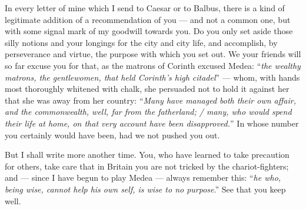 

 In every letter of mine which I send to Caesar or to Balbus, there is a kind of legitimate addition of a recommendation of you --- and not a common one, but with some signal mark of my goodwill towards you. Do you only set aside those silly notions and your longings for the city and city life, and accomplish, by perseverance and virtue, the purpose with which you set out. We your friends will so far excuse you for that, as the matrons of Corinth excused Medea: ``\textit{the wealthy matrons, the gentlewomen, that held Corinth's high citadel}'' --- whom, with hands most thoroughly whitened with chalk, she persuaded not to hold it against her that she was away from her country: ``\textit{Many have managed both their own affair, and the commonwealth, well, far from the fatherland; / many, who would spend their life at home, on that very account have been disapproved.}'' In whose number you certainly would have been, had we not pushed you out.

 But I shall write more another time. You, who have learned to take precaution for others, take care that in Britain you are not tricked by the chariot-fighters; and --- since I have begun to play Medea --- always remember this: ``\textit{he who, being wise, cannot help his own self, is wise to no purpose}.'' See that you keep well.
